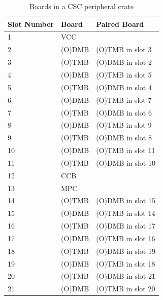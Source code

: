 \documentclass[10pt,a4paper]{article}
\begin{document}
\begin{table}[H]
\centering
\begin{tabular}{|l|l|l|} \hline
Slot Number& Board& Paired Board\\ \hline
1& VCC & \\ \hline
2& (O)DMB & (O)TMB in slot 3 \\ \hline
3& (O)TMB & (O)DMB in slot 2 \\ \hline
4& (O)DMB & (O)TMB in slot 5 \\ \hline
5& (O)TMB & (O)DMB in slot 4 \\ \hline
6& (O)DMB & (O)TMB in slot 7 \\ \hline
7& (O)TMB & (O)DMB in slot 6 \\ \hline
8& (O)DMB & (O)TMB in slot 9 \\ \hline
9& (O)TMB & (O)DMB in slot 8 \\ \hline
10& (O)DMB & (O)TMB in slot 11 \\ \hline
11& (O)TMB & (O)DMB in slot 10 \\ \hline
12& CCB & \\ \hline
13& MPC & \\ \hline
14& (O)TMB & (O)DMB in slot 15 \\ \hline
15& (O)DMB & (O)TMB in slot 14 \\ \hline
16& (O)TMB & (O)DMB in slot 17 \\ \hline
17& (O)DMB & (O)TMB in slot 16 \\ \hline
18& (O)TMB & (O)DMB in slot 19 \\ \hline
19& (O)DMB & (O)TMB in slot 18 \\ \hline
20& (O)TMB & (O)DMB in slot 21 \\ \hline
21& (O)DMB & (O)TMB in slot 20 \\ \hline
\end{tabular}
\caption{Boards in a CSC peripheral crate}
\label{tab:vmecrate}
\end{table}
\end{document}

